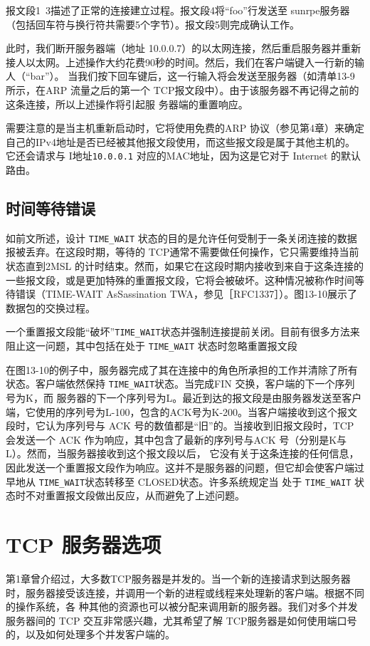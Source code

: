 报文段1~3描述了正常的连接建立过程。报文段4将“foo”行发送至 sunrpe服务器（包括回车符与换行符共需要5个字节）。报文段5则完成确认工作。

此时，我们断开服务器端（地址 10.0.0.7）的以太网连接，然后重启服务器并重新接人以太网。上述操作大约花费90秒的时间。然后，我们在客户端键入一行新的输人（“bar”）。
当我们按下回车键后，这一行输入将会发送至服务器（如清单13-9所示，在ARP 流量之后的第一个 TCP报文段中）。由于该服务器不再记得之前的这条连接，所以上述操作将引起服
务器端的重置响应。

需要注意的是当主机重新启动时，它将使用免费的ARP 协议（参见第4章）来确定自己的IPv4地址是否已经被其他报文段使用，而这些报文段是属于其他主机的。它还会请求与
I地址\verb|10.0.0.1| 对应的MAC地址，因为这是它对于 Internet 的默认路由。

\subsection{时间等待错误}
如前文所述，设计 \verb|TIME_WAIT| 状态的目的是允许任何受制于一条关闭连接的数据报被丢弃。在这段时期，等待的 TCP通常不需要做任何操作，它只需要维持当前状态直到2MSL
的计时结束。然而，如果它在这段时期内接收到来自于这条连接的一些报文段，或是更加特殊的重置报文段，它将会被破坏。这种情况被称作时间等待错误（TIME-WAIT AsSassination
TWA，参见［RFC1337］）。图13-10展示了数据包的交换过程。

一个重置报文段能“破坏”\verb|TIME_WAIT|状态并强制连接提前关闭。目前有很多方法来阻止这一问题，其中包括在处于 \verb|TIME_WAIT| 状态时忽略重置报文段

在图13-10的例子中，服务器完成了其在连接中的角色所承担的工作并清除了所有状态。客户端依然保持 \verb|TIME_WAIT|状态。当完成FIN 交换，客户端的下一个序列号为K，而
服务器的下一个序列号为L。最近到达的报文段是由服务器发送至客户端，它使用的序列号为L-100，包含的ACK号为K-200。当客户端接收到这个报文段时，它认为序列号与
ACK 号的数值都是“旧”的。当接收到旧报文段时，TCP 会发送一个 ACK 作为响应，其中包含了最新的序列号与ACK 号（分别是K与L）。然而，当服务器接收到这个报文段以后，
它没有关于这条连接的任何信息，因此发送一个重置报文段作为响应。这并不是服务器的问题，但它却会使客户端过早地从 \verb|TIME_WAIT|状态转移至 CLOSED状态。许多系统规定当
处于 \verb|TIME_WAIT| 状态时不对重置报文段做出反应，从而避免了上述问题。
\section{TCP 服务器选项}
第1章曾介绍过，大多数TCP服务器是并发的。当一个新的连接请求到达服务器时，服务器接受该连接，并调用一个新的进程或线程来处理新的客户端。根据不同的操作系统，各
种其他的资源也可以被分配来调用新的服务器。我们对多个并发服务器间的 TCP 交互非常感兴趣，尤其希望了解 TCP服务器是如何使用端口号的，以及如何处理多个并发客户端的。
